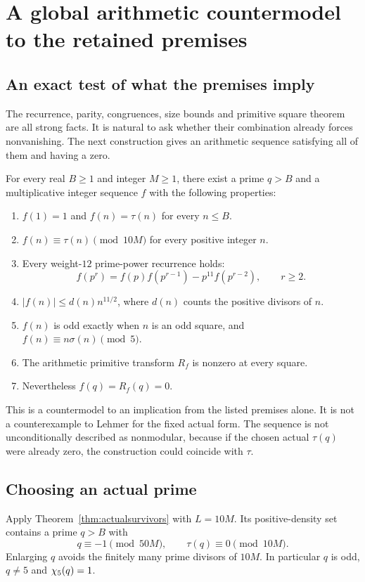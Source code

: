 \chapter{A global arithmetic countermodel to the retained premises}\label{ch:model}
\section{An exact test of what the premises imply}
The recurrence, parity, congruences, size bounds and primitive square theorem are all strong facts. It is natural to ask whether their combination already forces nonvanishing. The next construction gives an arithmetic sequence satisfying all of them and having a zero.

\begin{theorem}\label{thm:countermodel}
For every real $B\ge1$ and integer $M\ge1$, there exist a prime $q>B$ and a multiplicative integer sequence $f$ with the following properties:
\begin{enumerate}
\item $f(1)=1$ and $f(n)=\tau(n)$ for every $n\le B$.
\item $f(n)\equiv\tau(n)\pmod{10M}$ for every positive integer $n$.
\item Every weight-$12$ prime-power recurrence holds:
\[
f(p^r)=f(p)f(p^{r-1})-p^{11}f(p^{r-2}),\qquad r\ge2.
\]
\item $|f(n)|\le d(n)n^{11/2}$, where $d(n)$ counts the positive divisors of $n$.
\item $f(n)$ is odd exactly when $n$ is an odd square, and $f(n)\equiv n\sigma(n)\pmod5$.
\item The arithmetic primitive transform $R_f$ is nonzero at every square.
\item Nevertheless $f(q)=R_f(q)=0$.
\end{enumerate}
\end{theorem}

This is a countermodel to an implication from the listed premises alone. It is not a counterexample to Lehmer for the fixed actual form. The sequence is not unconditionally described as nonmodular, because if the chosen actual $\tau(q)$ were already zero, the construction could coincide with $\tau$.

\section{Choosing an actual prime}
Apply Theorem~\ref{thm:actualsurvivors} with $L=10M$. Its positive-density set contains a prime $q>B$ with
\[
q\equiv-1\pmod{50M},\qquad\tau(q)\equiv0\pmod{10M}.
\]
Enlarging $q$ avoids the finitely many prime divisors of $10M$. In particular $q$ is odd, $q\ne5$ and $\chi_5(q)=1$.

